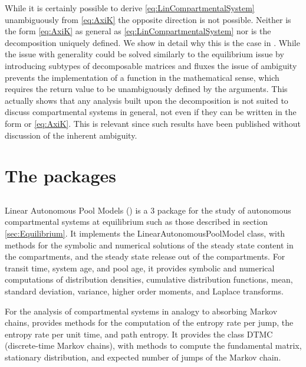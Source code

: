 While it is certainly possible to derive \eqref{eq:LinCompartmentalSystem} unambiguously from \eqref{eq:AxiK} the opposite direction is not possible. Neither is the form \eqref{eq:AxiK} as general as \eqref{eq:LinCompartmentalSystem} 
nor is the decomposition uniquely defined.
We show in detail why this is the case in .
While the issue with generality could be solved similarly to the equilibrium
issue by introducing subtypes of decomposable matrices and fluxes the issue of
ambiguity prevents the implementation of a function in the mathematical sense, which requires the return value to be unambiguously defined by the arguments.
This actually shows that any analysis built upon the decomposition is not
suited to discuss compartmental systems in general, not even if they can be
written in the form or \eqref{eq:AxiK}. This is relevant since such results have been published without discussion of the inherent ambiguity. 




\section{The \python{} packages}
\label{sec:PythonPackages}
\subsection{\LAPM{}}
Linear Autonomous Pool Models (\LAPM{}) is a \python{} 3 package for the study of autonomous compartmental systems at equilibrium such as those described in section \ref{sec:Equilibrium}. 
It implements the LinearAutonomousPoolModel class, with methods for the
symbolic and numerical solutions of the steady state content in the compartments, and the steady state release out of the compartments. For transit time, system age, and pool age, it provides symbolic and numerical computations of distribution densities, cumulative distribution functions, mean, standard deviation,           variance, higher order moments, and Laplace transforms. 

For the analysis of compartmental systems in analogy to absorbing Markov chains, \LAPM{} provides methods for the computation of the entropy rate per jump, the entropy rate per unit time, and path entropy. It provides the class DTMC (discrete-time Markov chains), with methods to compute the fundamental matrix, stationary distribution, and expected number of jumps of the Markov chain.

